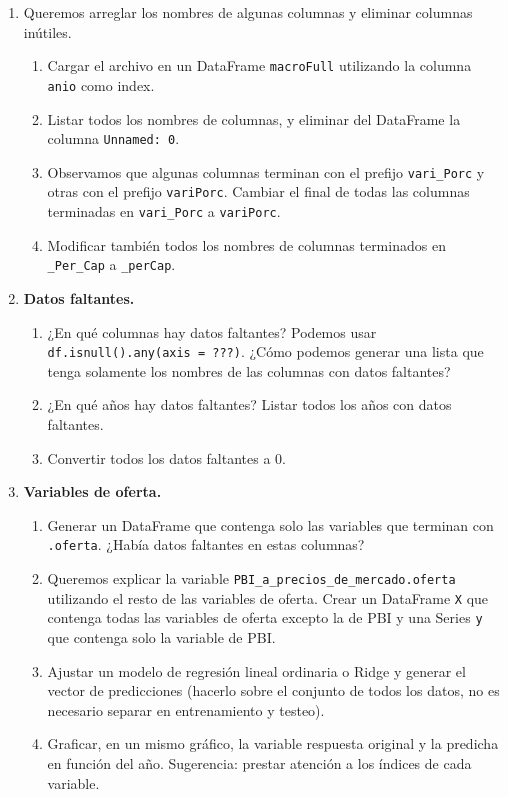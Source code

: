 \documentclass[a4paper,11pt]{article}
\theoremstyle{definition}
\begin{document}
\begin{enumerate}[resume]
\item Queremos arreglar los nombres de algunas columnas y eliminar columnas inútiles.
\begin{enumerate}
\item Cargar el archivo en un DataFrame \lstinline{macroFull} utilizando la columna \lstinline{anio} como index.
\item Listar todos los nombres de columnas, y eliminar del DataFrame la columna \lstinline{Unnamed: 0}.
\item Observamos que algunas columnas terminan con el prefijo \lstinline{vari_Porc} y otras con el prefijo \lstinline{variPorc}. Cambiar el final de todas las columnas terminadas en \lstinline{vari_Porc} a \lstinline{variPorc}.
\item Modificar también todos los nombres de columnas terminados en \lstinline{_Per_Cap} a \lstinline{_perCap}.
\end{enumerate}

\item \textbf{Datos faltantes.}
\begin{enumerate}
\item ¿En qué columnas hay datos faltantes? Podemos usar \lstinline{df.isnull().any(axis = ???)}. ¿Cómo podemos generar una lista que tenga solamente los nombres de las columnas con datos faltantes?
\item ¿En qué años hay datos faltantes? Listar todos los años con datos faltantes.
\item Convertir todos los datos faltantes a 0.
\end{enumerate}

\item \textbf{Variables de oferta.}
\begin{enumerate}
\item Generar un DataFrame que contenga solo las variables que terminan con \lstinline{.oferta}. ¿Había datos faltantes en estas columnas?
\item Queremos explicar la variable \lstinline{PBI_a_precios_de_mercado.oferta} utilizando el resto de las variables de oferta. Crear un DataFrame \lstinline{X} que contenga todas las variables de oferta excepto la de PBI y una Series \lstinline{y} que contenga solo la variable de PBI.
\item Ajustar un modelo de regresión lineal ordinaria o Ridge y generar el vector de predicciones (hacerlo sobre el conjunto de todos los datos, no es necesario separar en entrenamiento y testeo).
\item Graficar, en un mismo gráfico, la variable respuesta original y la predicha en función del año. Sugerencia: prestar atención a los índices de cada variable.
\end{enumerate}



\end{enumerate}
\end{document}
